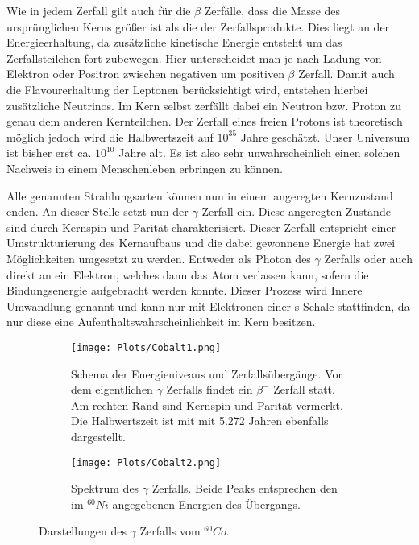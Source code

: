 \documentclass[]{article}
\begin{document}
Wie in jedem Zerfall gilt auch für die $\beta$ Zerfälle, dass die Masse des ursprünglichen Kerns größer ist als die der Zerfallsprodukte. Dies liegt an der Energieerhaltung, da zusätzliche kinetische Energie entsteht um das Zerfallsteilchen fort zubewegen. Hier unterscheidet man je nach Ladung von Elektron oder Positron zwischen negativen um positiven $\beta$ Zerfall. Damit auch die Flavourerhaltung der Leptonen berücksichtigt wird, entstehen hierbei zusätzliche Neutrinos. Im Kern selbst zerfällt dabei ein Neutron bzw. Proton zu genau dem anderen Kernteilchen. Der Zerfall eines freien Protons ist theoretisch möglich jedoch wird die Halbwertszeit auf $10^{35}$ Jahre geschätzt. Unser Universum ist bisher erst ca. $10^{10}$ Jahre alt. Es ist also sehr unwahrscheinlich einen solchen Nachweis in einem Menschenleben erbringen zu können.

Alle genannten Strahlungsarten können nun in einem angeregten Kernzustand enden. An dieser Stelle setzt nun der $\gamma$ Zerfall ein. Diese angeregten Zustände sind durch Kernspin und Parität charakterisiert. Dieser Zerfall entspricht einer Umstrukturierung des Kernaufbaus und die dabei gewonnene Energie hat zwei Möglichkeiten umgesetzt zu werden. Entweder als Photon des $\gamma$ Zerfalls oder auch direkt an ein Elektron, welches dann das Atom verlassen kann, sofern die Bindungsenergie aufgebracht werden konnte. Dieser Prozess wird Innere Umwandlung genannt und kann nur mit Elektronen einer s-Schale stattfinden, da nur diese eine Aufenthaltswahrscheinlichkeit im Kern besitzen.

\begin{figure}[H]
\centering
\begin{subfigure}[b]{.48\textwidth}
\centering
\texttt{[image: Plots/Cobalt1.png]}
\caption{Schema der Energieniveaus und Zerfallsübergänge. Vor dem eigentlichen $\gamma$ Zerfalls findet ein $\beta^-$ Zerfall statt. Am rechten Rand sind Kernspin und Parität vermerkt. Die Halbwertszeit ist mit mit 5.272 Jahren ebenfalls dargestellt.}
\end{subfigure}
\begin{subfigure}[b]{.48\textwidth}
\centering
\texttt{[image: Plots/Cobalt2.png]}
\caption{Spektrum des $\gamma$ Zerfalls. Beide Peaks entsprechen den im $^{60}Ni$ angegebenen Energien des Übergangs. }
\end{subfigure}
\caption{Darstellungen des $\gamma$ Zerfalls vom $^{60}Co$. \cite{cobalt}}
\end{figure}
\end{document}
